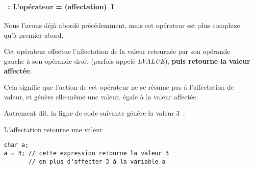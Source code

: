\begin{frame}[containsverbatim]
  \frametitle{\secname}
  \framesubtitle{\subsecname~: L'opérateur = (affectation)~I} 

  Nous l'avons déjà abordé précédemment, mais cet opérateur est plus complexe qu'à premier abord.
  \vspace{0.3cm}
  \par
  Cet opérateur effectue l'affectation de la valeur retournée par son opérande gauche à son opérande droit (parfois appelé \textit{LVALUE}), \textbf{puis retourne la valeur affectée}.
  \vspace{0.3cm}
  \par
  Cela signifie que l'action de cet opérateur ne se résume pas à l'affectation de valeur, et génère elle-même une valeur, égale à la valeur affectée.
  \vspace{0.3cm}
  \par
  Autrement dit, la ligne de code suivante génère la valeur 3~:
  \begin{exampleblock}{L'affectation retourne une valeur}
    \begin{verbatim}
char a;
a = 3; // cette expression retourne la valeur 3
       // en plus d'affecter 3 à la variable a\end{verbatim}
  \end{exampleblock}
\end{frame}

